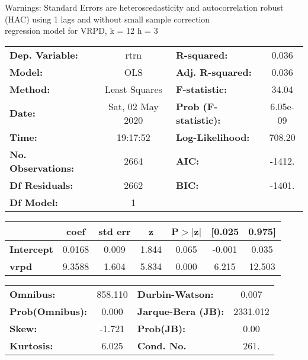 Warnings: \newline
 [1] Standard Errors are heteroscedasticity and autocorrelation robust (HAC) using 1 lags and without small sample correction\\ 

regression model for VRPD, k = 12 h = 3\begin{center}
\begin{tabular}{lclc}
\toprule
\textbf{Dep. Variable:}    &       rtrn       & \textbf{  R-squared:         } &     0.036   \\
\textbf{Model:}            &       OLS        & \textbf{  Adj. R-squared:    } &     0.036   \\
\textbf{Method:}           &  Least Squares   & \textbf{  F-statistic:       } &     34.04   \\
\textbf{Date:}             & Sat, 02 May 2020 & \textbf{  Prob (F-statistic):} &  6.05e-09   \\
\textbf{Time:}             &     19:17:52     & \textbf{  Log-Likelihood:    } &    708.20   \\
\textbf{No. Observations:} &        2664      & \textbf{  AIC:               } &    -1412.   \\
\textbf{Df Residuals:}     &        2662      & \textbf{  BIC:               } &    -1401.   \\
\textbf{Df Model:}         &           1      & \textbf{                     } &             \\
\bottomrule
\end{tabular}
\begin{tabular}{lcccccc}
                   & \textbf{coef} & \textbf{std err} & \textbf{z} & \textbf{P$> |$z$|$} & \textbf{[0.025} & \textbf{0.975]}  \\
\midrule
\textbf{Intercept} &       0.0168  &        0.009     &     1.844  &         0.065        &       -0.001    &        0.035     \\
\textbf{vrpd}      &       9.3588  &        1.604     &     5.834  &         0.000        &        6.215    &       12.503     \\
\bottomrule
\end{tabular}
\begin{tabular}{lclc}
\textbf{Omnibus:}       & 858.110 & \textbf{  Durbin-Watson:     } &    0.007  \\
\textbf{Prob(Omnibus):} &   0.000 & \textbf{  Jarque-Bera (JB):  } & 2331.012  \\
\textbf{Skew:}          &  -1.721 & \textbf{  Prob(JB):          } &     0.00  \\
\textbf{Kurtosis:}      &   6.025 & \textbf{  Cond. No.          } &     261.  \\
\bottomrule
\end{tabular}
\end{center}

